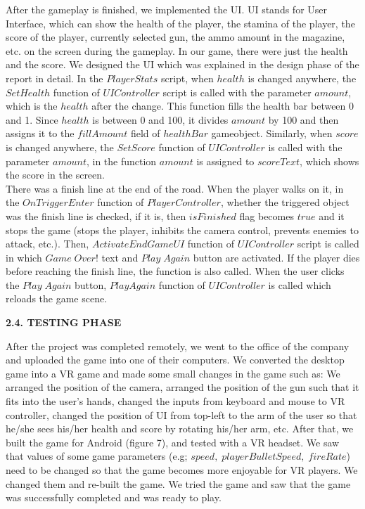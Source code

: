 \documentclass[a4paper]{article}
\begin{document}
\begin{minipage}{\dimexpr\textwidth-1cm}
\hspace{0.5cm}
After the gameplay is finished, we implemented the UI. UI stands for User Interface, which can show the health of the player, the stamina of the player, the score of the player, currently selected gun, the ammo amount in the magazine, etc. on the screen during the gameplay. In our game, there were just the health and the score. We designed the UI which was explained in the design phase of the report in detail. In the $PlayerStats$ script, when $health$ is changed anywhere, the $SetHealth$ function of $UIController$ script is called with the parameter $amount$, which is the $health$ after the change. This function fills the health bar between 0 and 1. Since $health$ is between 0 and 100, it divides $amount$ by 100 and then assigns it to the $fillAmount$ field of $healthBar$ gameobject. Similarly, when $score$ is changed anywhere, the $SetScore$ function of $UIController$ is called with the parameter $amount$, in the function $amount$ is assigned to $scoreText$, which shows the score in the screen.\\
There was a finish line at the end of the road. When the player walks on it, in the $OnTriggerEnter$ function of $PlayerController$, whether the triggered object was the finish line is checked, if it is, then $isFinished$ flag becomes $true$ and it stops the game (stops the player, inhibits the camera control, prevents enemies to attack, etc.). Then, $ActivateEndGameUI$ function of $UIController$ script is called in which $Game\; Over!$ text and $Play\; Again$ button are activated. If the player dies before reaching the finish line, the function is also called. When the user clicks the $Play\; Again$ button, $PlayAgain$ function of $UIController$ is called which reloads the game scene.
\end{minipage}\vspace{0.5cm}

\indent \textbf{2.4. TESTING PHASE}\\

\begin{minipage}{\dimexpr\textwidth-1cm}
\hspace{0.5cm} After the project was completed remotely, we went to the office of the company and uploaded the game into one of their computers. We converted the desktop game into a VR game and made some small changes in the game such as: We arranged the position of the camera, arranged the position of the gun such that it fits into the user's hands, changed the inputs from keyboard and mouse to VR controller, changed the position of UI from top-left to the arm of the user so that he/she sees his/her health and score by rotating his/her arm, etc. After that, we built the game for Android (figure 7), and tested with a VR headset. We saw that values of some game parameters (e.g; $speed,\; playerBulletSpeed,\; fireRate$) need to be changed so that the game becomes more enjoyable for VR players. We changed them and re-built the game. We tried the game and saw that the game was successfully completed and was ready to play.
\end{minipage}\vspace{1cm}
\end{document}
